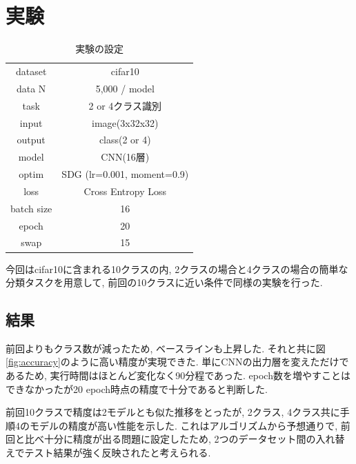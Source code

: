 \documentclass[twocolumn]{jarticle}     %
\begin{document}
\section{実験}

	\begin{table}[tb]
		\begin{center}
			\caption{実験の設定}
			\begin{tabular}{|c|c|} \hline
				dataset & cifar10 \\
				data N & 5,000 / model \\ \hline
				task & 2 or 4クラス識別 \\
				input & image(3x32x32) \\
				output & class(2 or 4) \\ \hline
				model & CNN(16層) \\
				optim & SDG (lr=0.001, moment=0.9) \\
				loss & Cross Entropy Loss \\ \hline
				batch size & 16 \\
				epoch & 20 \\ \hline
        swap & 15 \\ \hline
			\end{tabular}
			\label{tab:setting}
		\end{center}
	\end{table}

今回はcifar10に含まれる10クラスの内, 2クラスの場合と4クラスの場合の簡単な分類タスクを用意して, 前回の10クラスに近い条件で同様の実験を行った.

\subsection{結果}

前回よりもクラス数が減ったため, ベースラインも上昇した. それと共に図\ref{fig:accuracy}のように高い精度が実現できた. 単にCNNの出力層を変えただけであるため, 実行時間はほとんど変化なく90分程であった. epoch数を増やすことはできなかったが20 epoch時点の精度で十分であると判断した.

前回10クラスで精度は2モデルとも似た推移をとったが, 2クラス, 4クラス共に手順4のモデルの精度が高い性能を示した. これはアルゴリズムから予想通りで, 前回と比べ十分に精度が出る問題に設定したため, 2つのデータセット間の入れ替えでテスト結果が強く反映されたと考えられる.

\end{document}
